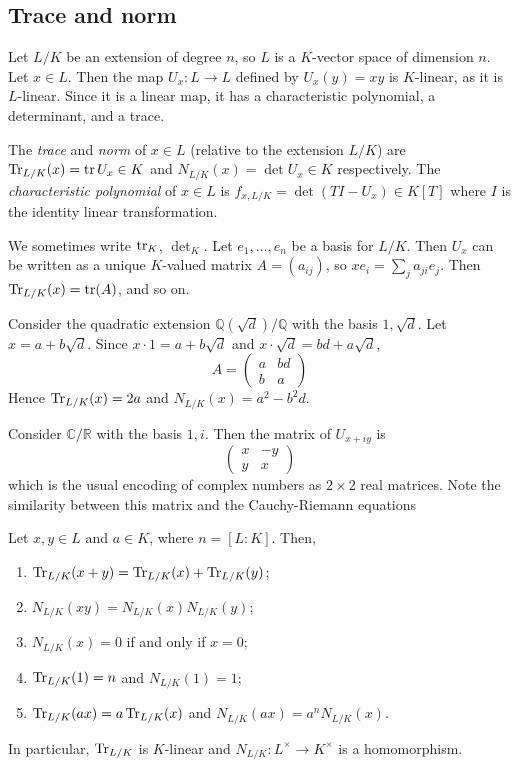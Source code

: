 \subsection{Trace and norm}
Let \( L / K \) be an extension of degree \( n \), so \( L \) is a \( K \)-vector space of dimension \( n \).
Let \( x \in L \).
Then the map \( U_x \colon L \to L \) defined by \( U_x(y) = xy \) is \( K \)-linear, as it is \( L \)-linear.
Since it is a linear map, it has a characteristic polynomial, a determinant, and a trace.
\begin{definition}
	The \emph{trace} and \emph{norm} of \( x \in L \) (relative to the extension \( L / K \)) are \( \Tr_{L/K}(x) = \tr U_x \in K \) and \( N_{L/K}(x) = \det U_x \in K \) respectively.
	The \emph{characteristic polynomial} of \( x \in L \) is \( f_{x,L/K} = \det (TI - U_x) \in K[T] \) where \( I \) is the identity linear transformation.
\end{definition}
We sometimes write \( \tr_K \), \( \det_K \).
Let \( e_1, \dots, e_n \) be a basis for \( L / K \).
Then \( U_x \) can be written as a unique \( K \)-valued matrix \( A = (a_{ij}) \), so \( xe_i = \sum_j a_{ji} e_j \).
Then \( \Tr_{L/K}(x) = \tr(A) \), and so on.
\begin{example}
	Consider the quadratic extension \( \mathbb Q(\sqrt d)/\mathbb Q \) with the basis \( 1, \sqrt d \).
	Let \( x = a + b\sqrt d \).
	Since \( x \cdot 1 = a + b \sqrt d \) and \( x \cdot \sqrt d = bd + a\sqrt d \),
	\[ A = \begin{pmatrix}
		a & bd \\
		b & a
	\end{pmatrix} \]
	Hence \( \Tr_{L/K}(x) = 2a \) and \( N_{L/K}(x) = a^2 - b^2 d \).
\end{example}
\begin{example}
	Consider \( \mathbb C / \mathbb R \) with the basis \( 1, i \).
	Then the matrix of \( U_{x+iy} \) is
	\[ \begin{pmatrix}
		x & -y \\
		y & x
	\end{pmatrix} \]
	which is the usual encoding of complex numbers as \( 2 \times 2 \) real matrices.
	Note the similarity between this matrix and the Cauchy-Riemann equations
\end{example}
\begin{lemma}
	Let \( x, y \in L \) and \( a \in K \), where \( n = [L : K] \).
	Then,
	\begin{enumerate}
		\item \( \Tr_{L/K}(x+y) = \Tr_{L/K}(x) + \Tr_{L/K}(y) \);
		\item \( N_{L/K}(xy) = N_{L/K}(x)N_{L/K}(y) \);
		\item \( N_{L/K}(x) = 0 \) if and only if \( x = 0 \);
		\item \( \Tr_{L/K}(1) = n \) and \( N_{L/K}(1) = 1 \);
		\item \( \Tr_{L/K}(ax) = a\Tr_{L/K}(x) \) and \( N_{L/K}(ax) = a^n N_{L/K}(x) \).
	\end{enumerate}
	In particular, \( \Tr_{L/K} \) is \( K \)-linear and \( N_{L/K} \colon L^\times \to K^\times \) is a homomorphism.
\end{lemma}
